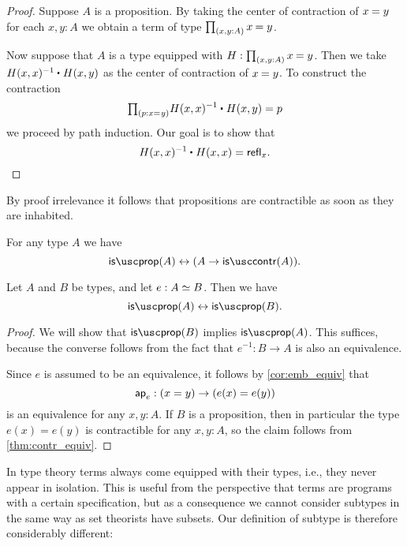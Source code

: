 \begin{proof}
Suppose $A$ is a proposition. By taking the center of contraction of $\id{x}{y}$ for each $x,y:A$ we obtain a term of type $\prd{x,y:A}\id{x}{y}$.

Now suppose that $A$ is a type equipped with $H:\prd{x,y:A}\id{x}{y}$. Then we take $\ct{H(x,x)^{-1}}{H(x,y)}$ as the center of contraction of $\id{x}{y}$. To construct the contraction
\begin{equation*}
\prd{p:\id{x}{y}} \ct{H(x,x)^{-1}}{H(x,y)}=p
\end{equation*}
we proceed by path induction. Our goal is to show that
\begin{equation*}
\ct{H(x,x)^{-1}}{H(x,x)}=\refl{x}.\qedhere
\end{equation*}
\end{proof}

By proof irrelevance it follows that propositions are contractible as soon as they are inhabited.

\begin{cor}\label{cor:contr_prop}
For any type $A$ we have
\begin{equation*}
\isprop(A)\leftrightarrow (A\to\iscontr(A)).
\end{equation*}
\end{cor}

\begin{lem}\label{lem:prop_equiv}
Let $A$ and $B$ be types, and let $e:\eqv{A}{B}$. Then we have
\begin{equation*}
\isprop(A)\leftrightarrow\isprop(B).
\end{equation*}
\end{lem}

\begin{proof}
We will show that $\isprop(B)$ implies $\isprop(A)$. This suffices, because the converse follows from the fact that $e^{-1}:B\to A$ is also an equivalence. 

Since $e$ is assumed to be an equivalence, it follows by \cref{cor:emb_equiv} that
\begin{equation*}
\mathsf{ap}_{e} : (x=y)\to (e(x)=e(y))
\end{equation*}
is an equivalence for any $x,y:A$. If $B$ is a proposition, then in particular the type $e(x)=e(y)$ is contractible for any $x,y:A$, so the claim follows from \cref{thm:contr_equiv}.
\end{proof}

In type theory terms always come equipped with their types, i.e., they never appear in isolation. This is useful from the perspective that terms are programs with a certain specification, but as a consequence we cannot consider subtypes in the same way as set theorists have subsets. Our definition of subtype is therefore considerably different:

